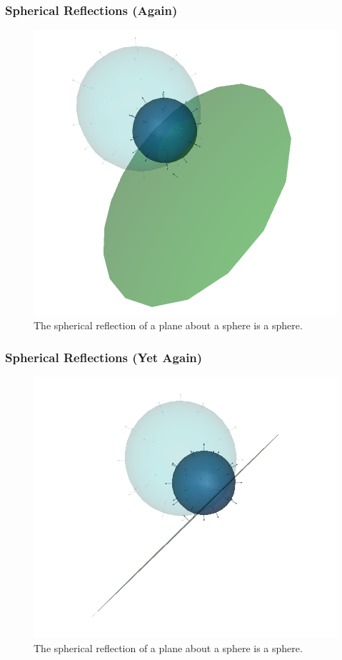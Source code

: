 \documentclass{beamer}
\begin{document}
\begin{frame}
\frametitle{Spherical Reflections (Again)}
\begin{figure}
\centering
\includegraphics[scale=0.3]{SphericalReflectionPerspectiveOne}
\caption{The spherical reflection of a plane about a sphere is a sphere.}
\end{figure}
\end{frame}

\begin{frame}
\frametitle{Spherical Reflections (Yet Again)}
\begin{figure}
\centering
\includegraphics[scale=0.3]{SphericalReflectionPerspectiveTwo}
\caption{The spherical reflection of a plane about a sphere is a sphere.}
\end{figure}
\end{frame}
\end{document}
